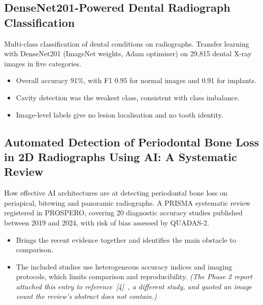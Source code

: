 \subsection{DenseNet201-Powered Dental Radiograph Classification~\cite{kaushik2025densenet201}}
 Multi-class classification of dental conditions on radiographs.
 Transfer learning with DenseNet201 (ImageNet weights, Adam optimiser) on 29,815
dental X-ray images in five categories.
\begin{itemize}
\item Overall accuracy 91\%, with F1 0.95 for normal images and 0.91 for implants.
\end{itemize}
\begin{itemize}
\item Cavity detection was the weakest class, consistent with class imbalance.
\item Image-level labels give no lesion localisation and no tooth identity.
\end{itemize}

\subsection{Automated Detection of Periodontal Bone Loss in 2D Radiographs Using AI: A Systematic Review~\cite{iacob2025automated}}
\label{lit:iacob}
 How effective AI architectures are at detecting periodontal bone loss on
periapical, bitewing and panoramic radiographs.
 A PRISMA systematic review registered in PROSPERO, covering 20 diagnostic
accuracy studies published between 2019 and 2024, with risk of bias assessed by QUADAS-2.
\begin{itemize}
\item Brings the recent evidence together and identifies the main obstacle to comparison.
\end{itemize}
\begin{itemize}
\item The included studies use heterogeneous accuracy indices and imaging protocols, which limits
  comparison and reproducibility. \emph{(The Phase 2 report attached this entry to
  reference~[4]~\cite{muresanu2024automating}, a different study, and quoted an image count the
  review's abstract does not contain.)}
\end{itemize}

